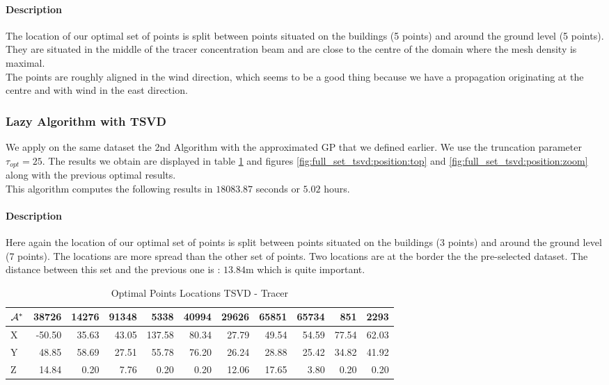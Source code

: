 \paragraph{Description}

The location of our optimal set of points is split between points situated on the buildings (5 points) and around the ground level (5 points). They are situated in the middle of the tracer concentration beam and are close to the centre of the domain where the mesh density is maximal. \\ 

The points are roughly aligned in the wind direction, which seems to be a good thing because we have a propagation originating at the centre and with wind in the east direction. 


\subsubsection{Lazy Algorithm with TSVD} \label{sec:res:TSVD}

We apply on the same dataset the 2nd Algorithm with the approximated GP that we defined earlier. We use the truncation parameter $\tau_{opt} = 25$. The results we obtain are displayed in table \ref{tab:tsvd:data} and figures \ref{fig:full_set_tsvd:position:top} and \ref{fig:full_set_tsvd:position:zoom} along with the previous optimal results. \\ 
 
This algorithm computes the following results in $18083.87$ seconds or $5.02$ hours. 
 
 \paragraph{Description}

Here again the location of our optimal set of points is split between points situated on the buildings (3 points) and around the ground level (7 points). The locations are more spread than the other set of points. Two locations are at the border the the pre-selected dataset. The distance between this set and the previous one is : $13.84$m which is quite important.  \\ 



\begin{table}[h]
\centering
\footnotesize
\begin{tabular}{l|rrrrrrrrrr}
\toprule
$\mathcal{A}^*$ &  38726 &  14276 &  91348 &  5338  &  40994 &  29626 &  65851 &  65734 &  851   &  2293  \\
\midrule
X & -50.50 &  35.63 &  43.05 & 137.58 &  80.34 &  27.79 &  49.54 &  54.59 &  77.54 &  62.03 \\
Y &  48.85 &  58.69 &  27.51 &  55.78 &  76.20 &  26.24 &  28.88 &  25.42 &  34.82 &  41.92 \\
Z &  14.84 &   0.20 &   7.76 &   0.20 &   0.20 &  12.06 &  17.65 &   3.80 &   0.20 &   0.20 \\
\bottomrule
\end{tabular}
\caption{Optimal Points Locations TSVD - Tracer}
\label{tab:tsvd:data}
\end{table}


